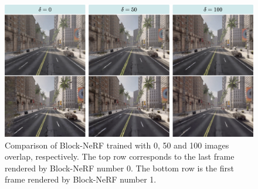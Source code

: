 \begin{figure}[ht]
    \centering
    \includegraphics[width=1.0\textwidth]{figures/overlap-v2.png}
    \caption[Block-NeRF trained with different amount of overlap.]{Comparison of Block-NeRF trained with 0, 50 and 100 images overlap, respectively. The top row corresponds to the last frame rendered by Block-NeRF number 0. The bottom row is the first frame rendered by Block-NeRF number 1.}
    \label{fig:overlap}
\end{figure}